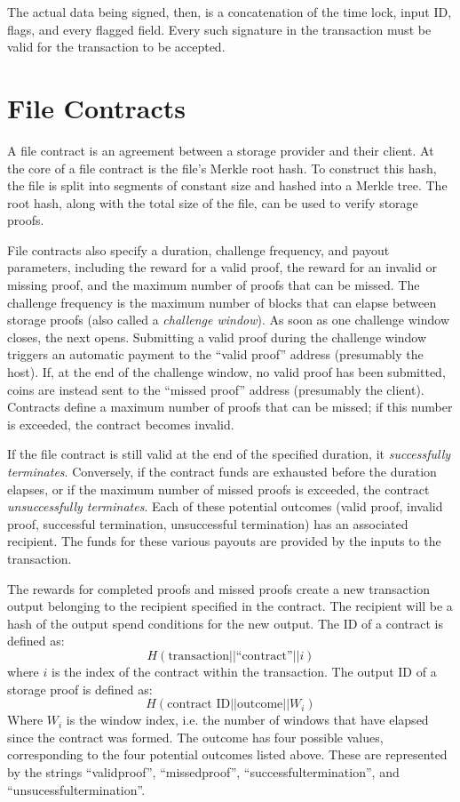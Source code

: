 \documentclass[twocolumn]{article}
\begin{document}
The actual data being signed, then, is a concatenation of the time lock, input ID, flags, and every flagged field.
Every such signature in the transaction must be valid for the transaction to be accepted.

\section{File Contracts}
\label{sec:contracts}
A file contract is an agreement between a storage provider and their client.
At the core of a file contract is the file's Merkle root hash.
To construct this hash, the file is split into segments of constant size and hashed into a Merkle tree.
The root hash, along with the total size of the file, can be used to verify storage proofs.

File contracts also specify a duration, challenge frequency, and payout parameters, including the reward for a valid proof, the reward for an invalid or missing proof, and the maximum number of proofs that can be missed.
The challenge frequency is the maximum number of blocks that can elapse between storage proofs (also called a \textit{challenge window}).
As soon as one challenge window closes, the next opens.
Submitting a valid proof during the challenge window triggers an automatic payment to the ``valid proof'' address (presumably the host).
If, at the end of the challenge window, no valid proof has been submitted, coins are instead sent to the ``missed proof'' address (presumably the client).
Contracts define a maximum number of proofs that can be missed; if this number is exceeded, the contract becomes invalid.

If the file contract is still valid at the end of the specified duration, it \textit{successfully terminates}.
Conversely, if the contract funds are exhausted before the duration elapses, or if the maximum number of missed proofs is exceeded, the contract \textit{unsuccessfully terminates}.
Each of these potential outcomes (valid proof, invalid proof, successful termination, unsuccessful termination) has an associated recipient.
The funds for these various payouts are provided by the inputs to the transaction.

The rewards for completed proofs and missed proofs create a new transaction output belonging to the recipient specified in the contract.
The recipient will be a hash of the output spend conditions for the new output.
The ID of a contract is defined as:
\[
	H(\text{transaction} || \text{``contract''} || i)
\]
where $i$ is the index of the contract within the transaction.
The output ID of a storage proof is defined as:
\[
	H(\text{contract ID} || \text{outcome} || W_i)
\]
Where $W_i$ is the window index, i.e. the number of windows that have elapsed since the contract was formed.
The outcome has four possible values, corresponding to the four potential outcomes listed above.
These are represented by the strings ``validproof'', ``missedproof'', ``successfultermination'', and ``unsucessfultermination''.
\end{document}
